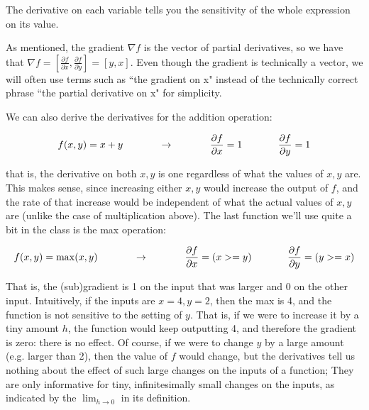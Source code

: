 The derivative on each variable tells you the sensitivity of the whole expression on its value.

As mentioned, the gradient $\nabla f$ is the vector of partial derivatives, so we have that $\nabla f = [\frac{\partial f}{\partial x}, \frac{\partial f}{\partial y}] = [y, x]$. Even though the gradient is technically a vector, we will often use terms such as ``the gradient on x" instead of the technically correct phrase ``the partial derivative on x" for simplicity.

We can also derive the derivatives for the addition operation:

\begin{equation}
f(x,y) = x + y \hspace{0.5in} \rightarrow \hspace{0.5in} \frac{\partial f}{\partial x} = 1 \hspace{0.5in} \frac{\partial f}{\partial y} = 1
\end{equation}

that is, the derivative on both $x,y$ is one regardless of what the values of $x,y$ are. This makes sense, since increasing either $x,y$ would increase the output of $f$, and the rate of that increase would be independent of what the actual values of $x,y$ are (unlike the case of multiplication above). The last function we’ll use quite a bit in the class is the max operation:

\begin{equation}
f(x,y) = \max(x, y) \hspace{0.5in} \rightarrow \hspace{0.5in} \frac{\partial f}{\partial x} = (x >= y) \hspace{0.5in} \frac{\partial f}{\partial y} = (y >= x)
\end{equation}

That is, the (sub)gradient is 1 on the input that was larger and 0 on the other input. Intuitively, if the inputs are $x=4,y=2$, then the max is 4, and the function is not sensitive to the setting of $y$. That is, if we were to increase it by a tiny amount $h$, the function would keep outputting 4, and therefore the gradient is zero: there is no effect. Of course, if we were to change $y$ by a large amount (e.g. larger than 2), then the value of $f$ would change, but the derivatives tell us nothing about the effect of such large changes on the inputs of a function; They are only informative for tiny, infinitesimally small changes on the inputs, as indicated by the $\lim_{h \rightarrow 0}$ in its definition.


